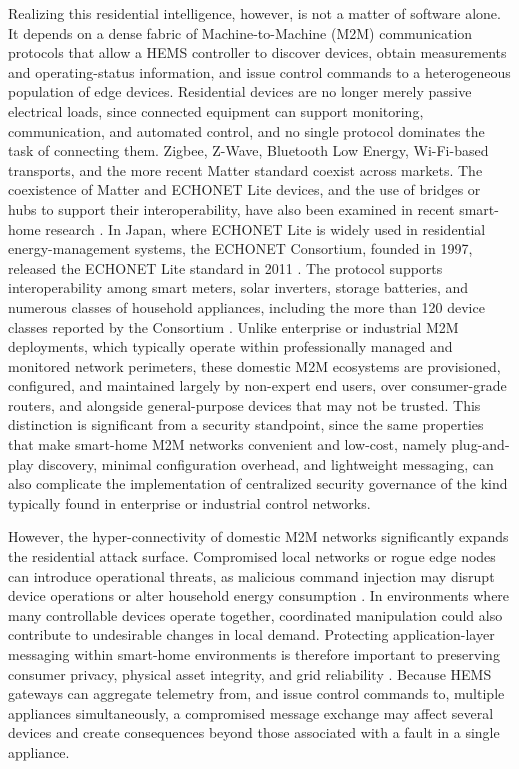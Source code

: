 Realizing this residential intelligence, however, is not a matter of software alone. It depends on a dense fabric of Machine-to-Machine (M2M) communication protocols that allow a HEMS controller to discover devices, obtain measurements and operating-status information, and issue control commands to a heterogeneous population of edge devices. Residential devices are no longer merely passive electrical loads, since connected equipment can support monitoring, communication, and automated control, and no single protocol dominates the task of connecting them. Zigbee, Z-Wave, Bluetooth Low Energy, Wi-Fi-based transports, and the more recent Matter standard coexist across markets. The coexistence of Matter and ECHONET Lite devices, and the use of bridges or hubs to support their interoperability, have also been examined in recent smart-home research \citep{takakiStudyRemoteControl2024}. In Japan, where ECHONET Lite is widely used in residential energy-management systems, the ECHONET Consortium, founded in 1997, released the ECHONET Lite standard in 2011 \citep{isshikiCaseStudyEcological2015,sangumpaiDevelopmentRealTimeInterworking2017}. The protocol supports interoperability among smart meters, solar inverters, storage batteries, and numerous classes of household appliances, including the more than 120 device classes reported by the Consortium \citep{ECHONETPart2}. Unlike enterprise or industrial M2M deployments, which typically operate within professionally managed and monitored network perimeters, these domestic M2M ecosystems are provisioned, configured, and maintained largely by non-expert end users, over consumer-grade routers, and alongside general-purpose devices that may not be trusted. This distinction is significant from a security standpoint, since the same properties that make smart-home M2M networks convenient and low-cost, namely plug-and-play discovery, minimal configuration overhead, and lightweight messaging, can also complicate the implementation of centralized security governance of the kind typically found in enterprise or industrial control networks.

However, the hyper-connectivity of domestic M2M networks significantly expands the residential attack surface. Compromised local networks or rogue edge nodes can introduce operational threats, as malicious command injection may disrupt device operations or alter household energy consumption \citep{heartfieldTaxonomyCyberphysicalThreats2018,almaniAssessingSecurityVulnerabilities2025,buil-gilDigitalHarmsSmart2023}. In environments where many controllable devices operate together, coordinated manipulation could also contribute to undesirable changes in local demand. Protecting application-layer messaging within smart-home environments is therefore important to preserving consumer privacy, physical asset integrity, and grid reliability \citep{heartfieldTaxonomyCyberphysicalThreats2018,buil-gilDigitalHarmsSmart2023,almaniAssessingSecurityVulnerabilities2025}. Because HEMS gateways can aggregate telemetry from, and issue control commands to, multiple appliances simultaneously, a compromised message exchange may affect several devices and create consequences beyond those associated with a fault in a single appliance.

